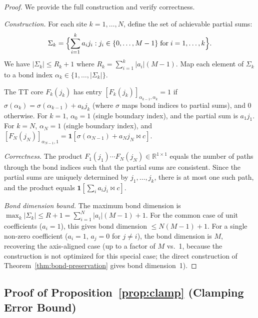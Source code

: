 \documentclass[11pt]{article}
\newcommand{\R}{\mathbb{R}}
\begin{document}
\begin{proof}
We provide the full construction and verify correctness.

\emph{Construction.}
For each site $k = 1, \ldots, N$, define the set of achievable
partial sums:
\[
  \Sigma_k = \Bigl\{ \sum_{i=1}^{k} a_i j_i :
    j_i \in \{0, \ldots, M-1\} \;\text{for}\; i = 1, \ldots, k \Bigr\}.
\]
We have $|\Sigma_k| \leq R_k + 1$ where
$R_k = \sum_{i=1}^{k} |a_i|(M-1)$.
Map each element of $\Sigma_k$ to a bond index
$\alpha_k \in \{1, \ldots, |\Sigma_k|\}$.

The TT core $F_k(j_k)$ has entry
$[F_k(j_k)]_{\alpha_{k-1}, \alpha_k} = 1$ if
$\sigma(\alpha_k) = \sigma(\alpha_{k-1}) + a_k j_k$
(where $\sigma$ maps bond indices to partial sums),
and $0$ otherwise.
For $k=1$, $\alpha_0 = 1$ (single boundary index), and the
partial sum is $a_1 j_1$.
For $k=N$, $\alpha_N = 1$ (single boundary index), and
$[F_N(j_N)]_{\alpha_{N-1}, 1} =
  \mathbf{1}[\sigma(\alpha_{N-1}) + a_N j_N \bowtie c]$.

\emph{Correctness.}
The product $F_1(j_1) \cdots F_N(j_N) \in \R^{1 \times 1}$ equals
the number of paths through the bond indices such that the partial
sums are consistent.
Since the partial sums are uniquely determined by $j_1, \ldots, j_k$,
there is at most one such path, and the product equals
$\mathbf{1}[\sum_i a_i j_i \bowtie c]$.

\emph{Bond dimension bound.}
The maximum bond dimension is
$\max_k |\Sigma_k| \leq R + 1 = \sum_{i=1}^{N} |a_i|(M-1) + 1$.
For the common case of unit coefficients ($a_i = 1$), this gives
bond dimension $\leq N(M-1) + 1$.
For a single non-zero coefficient ($a_i = 1$, $a_j = 0$ for
$j \neq i$), the bond dimension is $M$, recovering the axis-aligned
case (up to a factor of $M$ vs.\ 1, because the construction is
not optimized for this special case; the direct construction of
Theorem~\ref{thm:bond-preservation} gives bond dimension~1).
\end{proof}

\subsection{Proof of Proposition~\ref{prop:clamp} (Clamping Error Bound)}
\end{document}
